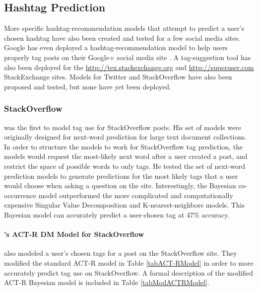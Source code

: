 \documentclass[man,floatsintext,donotrepeattitle]{apa6}
\begin{document}
\subsection{Hashtag Prediction}

More specific hashtag-recommendation models that attempt to predict a user's chosen hashtag have also been created and tested for a few social media sites.
Google has even deployed a hashtag-recommendation model to help users properly tag posts on their Google+ social media site \parencite{GoogleKeynote2013}.
A tag-suggestion tool has also been deployed for the \url{http://tex.stackexchange.org} and \url{http://superuser.com} StackExchange sites.
Models for Twitter and StackOverflow have also been proposed and tested, but none have yet been deployed.

\subsubsection{StackOverflow}

\textcite{Kuo2011} was the first to model tag use for StackOverflow posts.
His set of models were originally designed for next-word prediction for large text document collections.
In order to structure the models to work for StackOverflow tag prediction, the models would request the most-likely next word after a user created a post, and restrict the space of possible words to only tags.
He tested the set of next-word prediction models to generate predictions for the most likely tags that a user would choose when asking a question on the site.
Interestingly, the Bayesian co-occurrence model outperformed the more complicated and computationally expensive Singular Value Decomposition and K-nearest-neighbors models.
This Bayesian model can accurately predict a user-chosen tag at 47\% accuracy.

\paragraph{\texorpdfstring{\textcite{Stanley2013}}{Stanley2013}'s ACT-R DM Model for StackOverflow}

\textcite{Stanley2013} also modeled a user's chosen tags for a post on the StackOverflow site.
They modified the standard ACT-R model in Table \ref{tabACT-RModel} in order to more accurately predict tag use on StackOverflow.
A formal description of the modified ACT-R Bayesian model is included in Table \ref{tabModACTRModel}.
\end{document}
